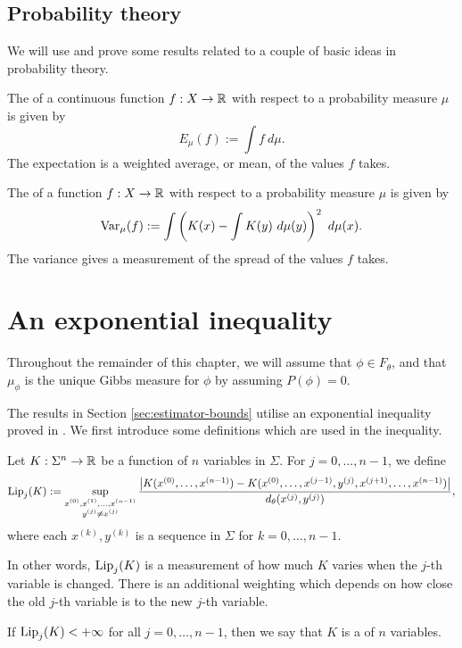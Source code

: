 \subsection{Probability theory}
We will use and prove some results related to a couple of basic ideas in probability theory.
\begin{definition}
	The  of a continuous function $f : X \to \mathbb{R}$ with respect to a probability measure $\mu$ is given by
	\[
		E_\mu(f) := \int{f\ d\mu}.
	\]
	The expectation is a weighted average, or mean, of the values $f$ takes.~\cite[p127]{gray:probability}
\end{definition}

\begin{definition}
	The  of a function $f : X \to \mathbb{R}$ with respect to a probability measure $\mu$ is given by
	\[
		\operatorname{Var}_{\mu}(f) := \int{\left(K(x) - \int{K(y)\ d\mu(y)}\right)^2\ d\mu(x)}.
	\]
	The variance gives a measurement of the spread of the values $f$ takes.
\end{definition}

\section{An exponential inequality}
Throughout the remainder of this chapter, we will assume that $\phi \in F_\theta$, and that $\mu_\phi$ is the unique Gibbs measure for $\phi$ by assuming $P(\phi) = 0$.

The results in Section \ref{sec:estimator-bounds} utilise an exponential inequality proved in \cite{collet-martinez-schmitt:exp-ineq}. We first introduce some definitions which are used in the inequality.

\begin{definition}
	Let $K : \Sigma^n \to \mathbb{R}$ be a function of $n$ variables in $\Sigma$. For $j = 0, \dots, n - 1$, we define
	\[
		\operatorname{Lip}_j(K) := \sup_{\substack{x^{(0)}, x^{(1)}, \dots, x^{(n - 1)} \\ y^{(j)} \neq x^{(j)}}}{\frac{\left|K(x^{(0)}, \dots, x^{(n - 1)}) - K(x^{(0)}, \dots, x^{(j - 1)}, y^{(j)}, x^{(j + 1)}, \dots, x^{(n - 1)})\right|}{d_\theta(x^{(j)}, y^{(j)})}},
	\]
	where each $x^{(k)}, y^{(k)}$ is a sequence in $\Sigma$ for $k = 0, \dots, n - 1$.
	
	In other words, $\operatorname{Lip}_j(K)$ is a measurement of how much $K$ varies when the $j$-th variable is changed. There is an additional weighting which depends on how close the old $j$-th variable is to the new $j$-th variable.
	
	If $\operatorname{Lip}_j(K) < +\infty$ for all $j = 0, \dots, n - 1$, then we say that $K$ is a  of $n$ variables.
\end{definition}

